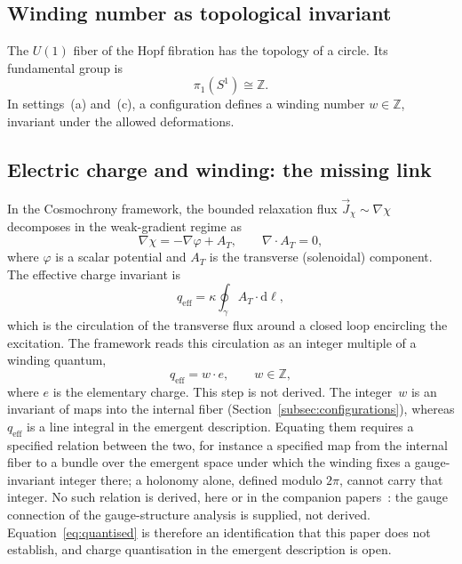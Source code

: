 \documentclass[11pt,a4paper]{article}
\begin{document}
    \subsection{Winding number as topological invariant}

      The $U(1)$ fiber of the Hopf fibration has the topology of a circle.
      Its fundamental group is
      \begin{equation}
        \label{eq:pi1}
        \pi_1(S^1) \cong \mathbb{Z}.
      \end{equation}
      In settings~(a) and~(c), a configuration defines a winding number
      $w \in \mathbb{Z}$, invariant under the allowed deformations.

    \subsection{Electric charge and winding: the missing link}
      \label{subsec:chargewinding}

      In the Cosmochrony framework, the bounded relaxation flux
      $\vec{J}_\chi \sim \nabla \chi$ decomposes in the weak-gradient regime
      as~\cite{Cosmochrony}
      \begin{equation}
        \label{eq:decomp}
        \nabla \chi = -\nabla \varphi + A_T,
        \qquad \nabla \cdot A_T = 0,
      \end{equation}
      where $\varphi$ is a scalar potential and $A_T$ is the transverse
      (solenoidal) component.
      The effective charge invariant is~\cite{Cosmochrony}
      \begin{equation}
        \label{eq:charge}
        q_{\mathrm{eff}} = \kappa \oint_\gamma A_T \cdot \mathrm{d}\ell,
      \end{equation}
      which is the circulation of the transverse flux around a closed loop
      encircling the excitation.
      The framework reads this circulation as an integer multiple of a
      winding quantum,
      \begin{equation}
        \label{eq:quantised}
        q_{\mathrm{eff}} = w \cdot e,
        \qquad w \in \mathbb{Z},
      \end{equation}
      where $e$ is the elementary charge.
      This step is not derived.
      The integer~$w$ is an invariant of maps into the internal fiber
      (Section~\ref{subsec:configurations}), whereas $q_{\mathrm{eff}}$ is a line
      integral in the emergent description.
      Equating them requires a specified relation between the two, for
      instance a specified map from the internal fiber to a bundle over the
      emergent space under which the winding fixes a gauge-invariant integer
      there; a holonomy alone, defined modulo $2\pi$, cannot carry that integer.
      No such relation is derived, here or in the companion
      papers~\cite{Cosmochrony,Beau2026q6a}: the gauge connection of the
      gauge-structure analysis is supplied, not derived.
      Equation~\eqref{eq:quantised} is therefore an identification that this
      paper does not establish, and charge quantisation in the emergent
      description is open.
\end{document}
